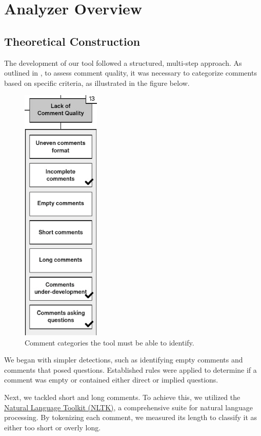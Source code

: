 
\chapter{Analyzer Overview} %

\label{Chapter3}

\section{Theoretical Construction}
The development of our tool followed a structured, multi-step approach. As outlined in , to assess comment quality, it was necessary to categorize comments based on specific criteria, as illustrated in the figure below.

\begin{figure}[ht]
	\centering\includegraphics[height=350pt]{figs/goal-schema.PNG}
	\captionsetup{justification=centering}
	\caption{Comment categories the tool must be able to identify.}
	\label{fig:goal-schema}
\end{figure}

\noindent We began with simpler detections, such as identifying empty comments and comments that posed questions. Established rules were applied to determine if a comment was empty or contained either direct or implied questions.

\noindent Next, we tackled short and long comments. To achieve this, we utilized the \href{https://www.nltk.org/}{Natural Language Toolkit (NLTK)}, a comprehensive suite for natural language processing. By tokenizing each comment, we measured its length to classify it as either too short or overly long.

